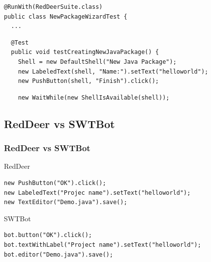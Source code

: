 \documentclass{beamer}
\begin{document}
\begin{frame}[fragile]
\begin{lstlisting}
@RunWith(RedDeerSuite.class)
public class NewPackageWizardTest {
  ...
\end{lstlisting}
\pause
\begin{lstlisting}
  @Test
  public void testCreatingNewJavaPackage() {    
    Shell = new DefaultShell("New Java Package");
    new LabeledText(shell, "Name:").setText("helloworld");
    new PushButton(shell, "Finish").click();
\end{lstlisting}
\pause
\begin{lstlisting}
    new WaitWhile(new ShellIsAvailable(shell));
\end{lstlisting}
\end{frame}


\subsection{RedDeer vs SWTBot}
\begin{frame}[fragile]
\frametitle{RedDeer vs SWTBot}
RedDeer  
\begin{lstlisting}
new PushButton("OK").click();
new LabeledText("Projec name").setText("helloworld");
new TextEditor("Demo.java").save();
\end{lstlisting}
\vspace{0.5cm}
SWTBot
\begin{lstlisting}
bot.button("OK").click();
bot.textWithLabel("Project name").setText("helloworld");
bot.editor("Demo.java").save();
\end{lstlisting}
\end{frame}
\end{document}
